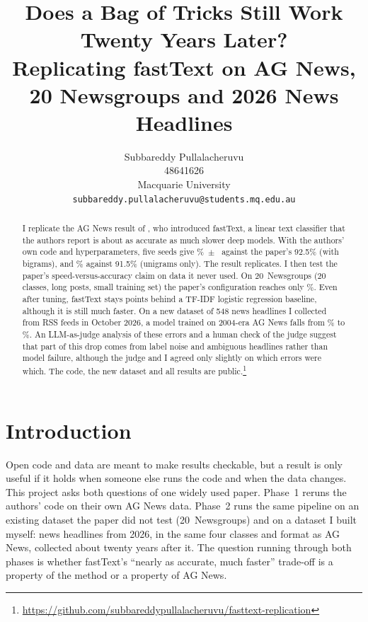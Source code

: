 \documentclass[11pt]{article}
\title{Does a Bag of Tricks Still Work Twenty Years Later?\\
Replicating fastText on AG News, 20 Newsgroups and 2026 News Headlines}
\author{Subbareddy Pullalacheruvu \\
  48641626 \\
  Macquarie University \\
  \texttt{subbareddy.pullalacheruvu@students.mq.edu.au}}
\begin{document}
\maketitle

\begin{abstract}
I replicate the AG News result of \citet{joulin-etal-2017-bag}, who introduced fastText, a
linear text classifier that the authors report is about as accurate as much slower deep
models. With the authors' own code and hyperparameters, five seeds give \AGbi\%~$\pm$~\AGbiSD{}
against the paper's 92.5\% (with bigrams), and \AGuni\% against 91.5\% (unigrams only). The
result replicates. I then test the paper's speed-versus-accuracy claim on data it never
used. On 20~Newsgroups (20 classes, long posts, small training set) the paper's
configuration reaches only \NGpaper\%. Even after tuning, fastText stays \NGbestGap{}
points behind a TF-IDF logistic regression baseline, although it is still much faster. On a
new dataset of 548 news headlines I collected from RSS feeds in October 2026, a model trained
on 2004-era AG News falls from \AGbi\% to \XF\%. An LLM-as-judge analysis of these errors
and a human check of the judge suggest that part of this drop comes from label noise and
ambiguous headlines rather than model failure, although the judge and I agreed only
slightly on which errors were which. The code, the new dataset and all results are public.\footnote{%
\url{https://github.com/subbareddypullalacheruvu/fasttext-replication}}
\end{abstract}

\section{Introduction}

Open code and data are meant to make results checkable, but a result is only useful if
it holds when someone else runs the code and when the data changes. This project asks
both questions of one widely used paper. Phase~1 reruns the authors' code on their own
AG News data. Phase~2 runs the same pipeline on an existing dataset the paper did not
test (20~Newsgroups) and on a dataset I built myself: news headlines from 2026, in the
same four classes and format as AG News, collected about twenty years after it. The
question running through both phases is whether fastText's ``nearly as accurate, much
faster'' trade-off is a property of the method or a property of AG News.
\end{document}
